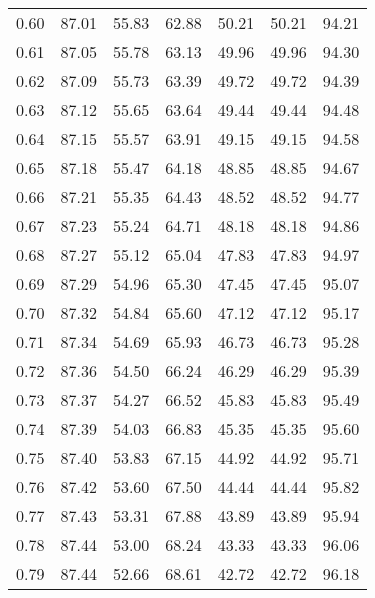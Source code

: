 \begin{tabular}{|c|c|c|c|c|c|c|}
      0.60 &     87.01 &     55.83 &      62.88 &   50.21 &      50.21 &         94.21 \\
      0.61 &     87.05 &     55.78 &      63.13 &   49.96 &      49.96 &         94.30 \\
      0.62 &     87.09 &     55.73 &      63.39 &   49.72 &      49.72 &         94.39 \\
      0.63 &     87.12 &     55.65 &      63.64 &   49.44 &      49.44 &         94.48 \\
      0.64 &     87.15 &     55.57 &      63.91 &   49.15 &      49.15 &         94.58 \\
      0.65 &     87.18 &     55.47 &      64.18 &   48.85 &      48.85 &         94.67 \\
      0.66 &     87.21 &     55.35 &      64.43 &   48.52 &      48.52 &         94.77 \\
      0.67 &     87.23 &     55.24 &      64.71 &   48.18 &      48.18 &         94.86 \\
      0.68 &     87.27 &     55.12 &      65.04 &   47.83 &      47.83 &         94.97 \\
      0.69 &     87.29 &     54.96 &      65.30 &   47.45 &      47.45 &         95.07 \\
      0.70 &     87.32 &     54.84 &      65.60 &   47.12 &      47.12 &         95.17 \\
      0.71 &     87.34 &     54.69 &      65.93 &   46.73 &      46.73 &         95.28 \\
      0.72 &     87.36 &     54.50 &      66.24 &   46.29 &      46.29 &         95.39 \\
      0.73 &     87.37 &     54.27 &      66.52 &   45.83 &      45.83 &         95.49 \\
      0.74 &     87.39 &     54.03 &      66.83 &   45.35 &      45.35 &         95.60 \\
      0.75 &     87.40 &     53.83 &      67.15 &   44.92 &      44.92 &         95.71 \\
      0.76 &     87.42 &     53.60 &      67.50 &   44.44 &      44.44 &         95.82 \\
      0.77 &     87.43 &     53.31 &      67.88 &   43.89 &      43.89 &         95.94 \\
      0.78 &     87.44 &     53.00 &      68.24 &   43.33 &      43.33 &         96.06 \\
      0.79 &     87.44 &     52.66 &      68.61 &   42.72 &      42.72 &         96.18 \\

\end{tabular}
